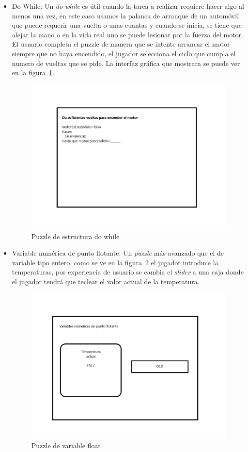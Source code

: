 \begin{itemize}
    \item Do While: Un \textit{do while} es útil cuando la tarea a realizar requiere hacer algo al menos una vez, en este caso usamos la palanca de arranque de un automóvil que puede requerir una vuelta o unas cuantas y cuando se inicia, se tiene que alejar la mano o en la vida real uno se puede lesionar por la fuerza del motor. El usuario completa el puzzle de manera que se intente arrancar el motor siempre que no haya encendido, el jugador selecciona el ciclo que cumpla el numero de vueltas que se pide. La interfaz gráfica que mostrara se puede ver en la figura~\ref{fig:puzzle_do_while}.
    \begin{figure}[H]
        \centering
        \includegraphics[width=0.5\linewidth]{images/PuzzleDoWhile.png}
        \caption{Puzzle de estructura do while}
        \label{fig:puzzle_do_while}
    \end{figure}
    \item Variable numérica de punto flotante: Un \textit{puzzle} más avanzado que el de variable tipo entero, como se ve en la figura~\ref{fig:puzzle_float} el jugador introduce la temperaturas, por experiencia de usuario se cambia el \textit{slider} a una caja donde el jugador tendrá que teclear el valor actual de la temperatura.
    \begin{figure}[H]
        \centering
        \includegraphics[width=0.5\linewidth]{images/PuzzleFloat.png}
        \caption{Puzzle de variable float}
        \label{fig:puzzle_float}
    \end{figure}

\end{itemize}
